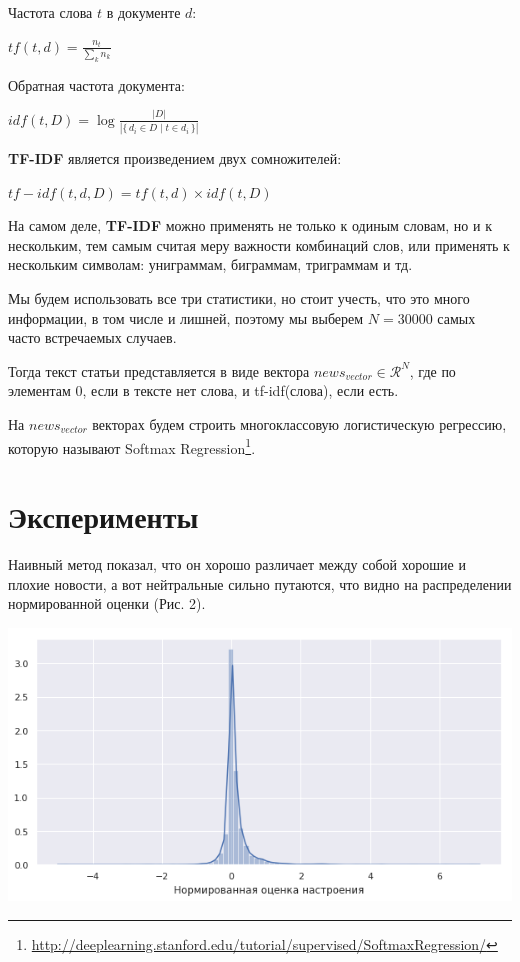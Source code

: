 \documentclass[12pt]{article}
\begin{document}
            Частота слова $t$ в документе $d$: 
            \begin{center}
                ${{tf} (t,d)={\frac {n_{t}}{\sum _{k}n_{k}}}}$
            \end{center}
            
            Обратная частота документа:
            \begin{center}
                ${idf} (t,D)=\log {\frac {|D|}{|\{\,d_{i}\in D\mid t\in d_{i}\,\}|}}$
            \end{center}

            \textbf{TF-IDF} является произведением двух сомножителей: 
            \begin{center}
                ${tf-idf}(t,d,D) = {tf}(t,d)\times {idf}(t,D)$
            \end{center}

            На самом деле, \textbf{TF-IDF} можно применять не только к одиным словам, но и к нескольким, тем
            самым считая меру важности комбинаций слов, или применять к нескольким символам:
            униграммам, биграммам, триграммам и тд. 

            Мы будем использовать все три статистики, но стоит учесть, что это много информации, в том числе и лишней,
            поэтому мы выберем $N = 30000$ самых часто встречаемых случаев. 

            Тогда текст статьи представляется в виде вектора $news_{vector} \in \mathcal{R}^N$, где по элементам 0, 
            если в тексте нет слова, и tf-idf(слова), если есть.

            На $news_{vector}$ векторах будем строить многоклассовую логистическую регрессию,
            которую называют Softmax Regression\footnote{\href{http://deeplearning.stanford.edu/tutorial/supervised/SoftmaxRegression/}{http://deeplearning.stanford.edu/tutorial/supervised/SoftmaxRegression/}}.

    \section{Эксперименты}
        Наивный метод показал, что он хорошо различает между собой хорошие и плохие новости,
        а вот нейтральные сильно путаются, что видно на распределении нормированной оценки (Рис. 2).
        \begin{center}
            \includegraphics[scale=0.7]{naive_norm}
        \end{center}
\end{document}
